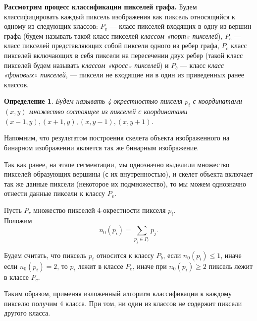 \documentclass[makeidx, a4paper, 14pt]{extarticle}
\newtheorem{definition}{Определение}
\begin{document}
\textbf{Рассмотрим процесс классификации пикселей графа.} Будем классифицировать каждый пиксель изображения как пиксель относящийся к одному из
следующих классов: $P_v$ --- класс пикселей входящих в одну из вершин графа (будем называть такой класс пикселей \emph{классом «порт» пикселей}),
$P_e$ --- класс пикселей представляющих собой пиксели одного из ребер графа, $P_c$ класс пикселей включающих в себя пиксели на пересечении двух ребер
(такой класс пикселей будем называть \emph{классом «кросс» пикселей}) и $P_b$ --- класс \emph{класс «фоновых» пикселей}, --- пиксели не входящие ни в один из приведенных ранее классов.

\begin{definition}
    Будем называть 4-окрестностью пикселя ${p_i}$ с координатами ${(x, y)}$ множество состоящее из пикселей с координатами
    ${(x-1, y), (x+1, y), (x, y-1), (x, y+1)}$.
\end{definition}

Напомним, что результатом построения скелета объекта изображенного на бинарном изображении является так же бинарным изображение.

Так как ранее, на этапе сегментации, мы однозначно выделили множество пикселей образующих вершины (с их внутренностью),
и скелет объекта включает так же данные пиксели (некоторое их подмножество), то мы можем однозначно отнести данные пиксели к классу $P_v$.

Пусть $P_r$ множество пикселей 4-окрестности пикселя $p_i$. \\
Положим \[
    n_0(p_i) = \sum_{p_j \in P_r} p_j.
\]

Будем считать, что пиксель $p_i$ относится к классу $P_b$, если $n_0(p_i) \le 1$, иначе если $n_0(p_i)=2$, то $p_i$ лежит в классе $P_e$,
иначе при $n_0(p_i) \ge 2$ пиксель лежит в классе $P_c$.

Таким образом, применяя изложенный алгоритм классификации к каждому пикселю получим 4 класса. При том, ни один из классов не содержит пиксели другого класса.
\end{document}
